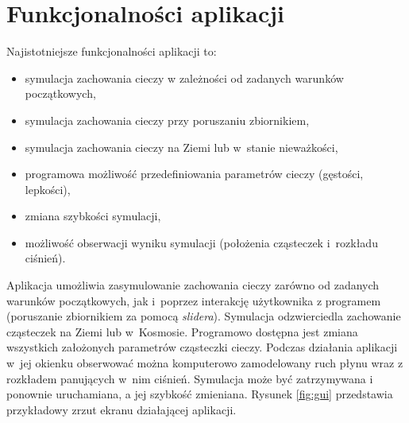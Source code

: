 
\section{Funkcjonalności aplikacji}
Najistotniejsze funkcjonalności aplikacji to:
\begin{itemize}
    \item symulacja zachowania cieczy w zależności od zadanych warunków początkowych,
    \item symulacja zachowania cieczy przy poruszaniu zbiornikiem,
    \item symulacja zachowania cieczy na Ziemi lub w~stanie nieważkości,
    \item programowa możliwość przedefiniowania parametrów cieczy (gęstości, lepkości),
    \item zmiana szybkości symulacji,
    \item możliwość obserwacji wyniku symulacji (położenia cząsteczek i~rozkładu ciśnień).
\end{itemize}

Aplikacja umożliwia zasymulowanie zachowania cieczy zarówno od zadanych warunków początkowych, jak i~poprzez interakcję użytkownika z programem (poruszanie zbiornikiem za pomocą \textit{slidera}). Symulacja odzwierciedla zachowanie cząsteczek na Ziemi lub w~Kosmosie.  Programowo dostępna jest zmiana wszystkich założonych parametrów cząsteczki cieczy. Podczas działania aplikacji w~jej okienku obserwować można komputerowo zamodelowany ruch płynu wraz z rozkładem panujących w~nim ciśnień. Symulacja może być zatrzymywana i ponownie uruchamiana, a jej szybkość zmieniana. Rysunek \ref{fig:gui} przedstawia przykładowy zrzut ekranu działającej aplikacji.